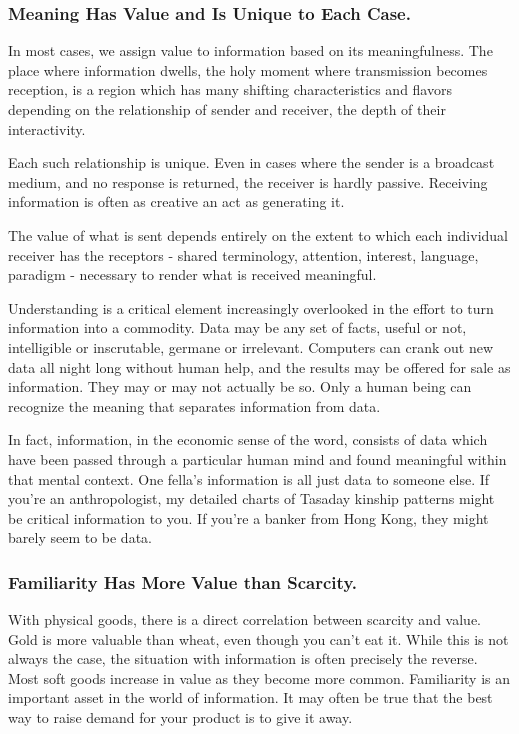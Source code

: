 \documentclass[
]{article}
\begin{document}
\hypertarget{header-n287}{%
\subsubsection{Meaning Has Value and Is Unique to Each
Case.}\label{header-n287}}

In most cases, we assign value to information based on its
meaningfulness. The place where information dwells, the holy moment
where transmission becomes reception, is a region which has many
shifting characteristics and flavors depending on the relationship of
sender and receiver, the depth of their interactivity.

Each such relationship is unique. Even in cases where the sender is a
broadcast medium, and no response is returned, the receiver is hardly
passive. Receiving information is often as creative an act as generating
it.

The value of what is sent depends entirely on the extent to which each
individual receiver has the receptors - shared terminology, attention,
interest, language, paradigm - necessary to render what is received
meaningful.

Understanding is a critical element increasingly overlooked in the
effort to turn information into a commodity. Data may be any set of
facts, useful or not, intelligible or inscrutable, germane or
irrelevant. Computers can crank out new data all night long without
human help, and the results may be offered for sale as information. They
may or may not actually be so. Only a human being can recognize the
meaning that separates information from data.

In fact, information, in the economic sense of the word, consists of
data which have been passed through a particular human mind and found
meaningful within that mental context. One fella's information is all
just data to someone else. If you're an anthropologist, my detailed
charts of Tasaday kinship patterns might be critical information to you.
If you're a banker from Hong Kong, they might barely seem to be data.

\hypertarget{header-n294}{%
\subsubsection{Familiarity Has More Value than
Scarcity.}\label{header-n294}}

With physical goods, there is a direct correlation between scarcity and
value. Gold is more valuable than wheat, even though you can't eat it.
While this is not always the case, the situation with information is
often precisely the reverse. Most soft goods increase in value as they
become more common. Familiarity is an important asset in the world of
information. It may often be true that the best way to raise demand for
your product is to give it away.
\end{document}
